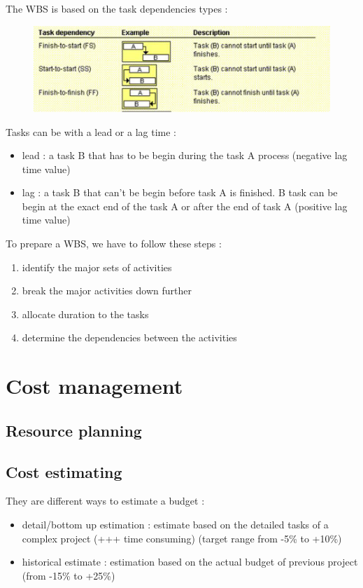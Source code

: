 \documentclass{article}
\begin{document}
The WBS is based on the task dependencies types :
\begin{figure}[H]
	\centering
	\includegraphics[scale=0.3]{TaskDependency.png}
	\caption{}
\end{figure}

Tasks can be with a lead or a lag time :
\begin{itemize}
	\item lead : a task B that has to be begin during the task A process (negative lag time value)
	\item lag : a task B that can't be begin before task A is finished. B task can be begin at the exact end of the task A or after the end of task A (positive lag time value)
\end{itemize}

To prepare a WBS, we have to follow these steps :
\begin{enumerate}
	\item identify the major sets of activities
	\item break the major activities down further
	\item allocate duration to the tasks
	\item determine the dependencies between the activities
\end{enumerate}

\section{Cost management}
\subsection{Resource planning}

\subsection{Cost estimating}
They are different ways to estimate a budget :
\begin{itemize}
	\item detail/bottom up estimation : estimate based on the detailed tasks of a complex project (+++ time consuming) (target range from -5\% to +10\%)
	\item historical estimate : estimation based on the actual budget of previous project (from -15\% to +25\%)
\end{itemize}
\end{document}
